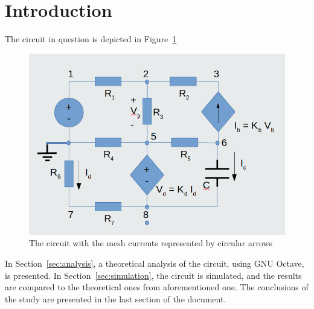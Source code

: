 \section{Introduction}
\label{sec:introduction}



The circuit in question is depicted in Figure~\ref{fig:circuit}
\begin{figure}
  \includegraphics[width=\linewidth]{circuit.png}
  \caption{The circuit with the mesh currents represented by circular arrows}
  \label{fig:circuit}
\end{figure}


In Section~\ref{sec:analysis}, a theoretical analysis of the circuit, using GNU Octave,  is presented. In Section~\ref{sec:simulation}, the circuit is simulated, and the results are compared to the theoretical ones from
aforementioned one. The conclusions of the study are presented in the last section of the document.


